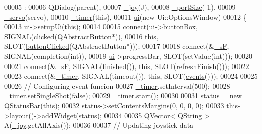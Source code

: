 \begin{DoxyCode}
00005                                                                               :
00006     QDialog(parent),
00007     \hyperlink{a00006_a1bf846ab681ab245f70adac30999947c}{\_joy}(J),
00008     \hyperlink{a00006_a9bd4dccc7a544b1db78dc8cf330b88f6}{\_portSize}(-1),
00009     \hyperlink{a00006_acba1566fea3f831000d5e1c1edc3e776}{\_servo}(servo),
00010     \hyperlink{a00006_af6320942b8558140989f552b3bbc1fbd}{\_timer}(\textcolor{keyword}{this}),
00011     \hyperlink{a00006_a8347442d5b3b670e8fff0c4102db1f88}{ui}(\textcolor{keyword}{new} Ui::OptionsWindow)
00012 \{
00013     \hyperlink{a00006_a8347442d5b3b670e8fff0c4102db1f88}{ui}->setupUi(\textcolor{keyword}{this});
00014     
00015     connect(\hyperlink{a00006_a8347442d5b3b670e8fff0c4102db1f88}{ui}->buttonBox, SIGNAL(clicked(QAbstractButton*)), 
00016             \textcolor{keyword}{this}, SLOT(\hyperlink{a00006_a1f7d6790701ff9b1301533b8ad045ede}{buttonClicked}(QAbstractButton*)));
00017     
00018     connect(&\hyperlink{a00006_ab143e1d06250ec778309da1a3807b602}{\_sF}, SIGNAL(completion(\textcolor{keywordtype}{int})),
00019             \hyperlink{a00006_a8347442d5b3b670e8fff0c4102db1f88}{ui}->progressBar, SLOT(setValue(\textcolor{keywordtype}{int})));
00020     
00021     connect(&\hyperlink{a00006_ab143e1d06250ec778309da1a3807b602}{\_sF}, SIGNAL(finished()), \textcolor{keyword}{this}, SLOT(\hyperlink{a00006_ae52f8ca70b1bfa4c8d21d25e49e309d7}{refreshFinish}()));
00022     
00023     connect(&\hyperlink{a00006_af6320942b8558140989f552b3bbc1fbd}{\_timer}, SIGNAL(timeout()), \textcolor{keyword}{this}, SLOT(\hyperlink{a00006_a18763ff318688083c7ee5a21f22e8e98}{events}()));
00024     
00025     
00026     \textcolor{comment}{// Configuring event funcion}
00027     \hyperlink{a00006_af6320942b8558140989f552b3bbc1fbd}{\_timer}.setInterval(500);
00028     \hyperlink{a00006_af6320942b8558140989f552b3bbc1fbd}{\_timer}.setSingleShot(\textcolor{keyword}{false});
00029     \hyperlink{a00006_af6320942b8558140989f552b3bbc1fbd}{\_timer}.start();
00030     
00031     \hyperlink{a00006_af031403c7017cf086c0b85186c53471e}{status} = \textcolor{keyword}{new} QStatusBar(\textcolor{keyword}{this});
00032     \hyperlink{a00006_af031403c7017cf086c0b85186c53471e}{status}->setContentsMargins(0, 0, 0, 0);
00033     this->layout()->addWidget(\hyperlink{a00006_af031403c7017cf086c0b85186c53471e}{status});    
00034     
00035     QVector< QString > A(\hyperlink{a00006_a1bf846ab681ab245f70adac30999947c}{\_joy}.getAllAxis());
00036     
00037     \textcolor{comment}{// Updating joystick data}

\end{DoxyCode}
